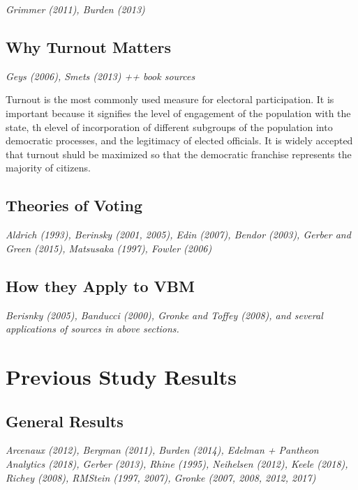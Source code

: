 \documentclass[12pt,twoside]{reedthesis}
\begin{document}
  \emph{Grimmer (2011), Burden (2013)}
  
  \subsection{Why Turnout Matters}\label{why-turnout-matters}
  
  \emph{Geys (2006), Smets (2013) ++ book sources}
  
  Turnout is the most commonly used measure for electoral participation.
  It is important because it signifies the level of engagement of the
  population with the state, th elevel of incorporation of different
  subgroups of the population into democratic processes, and the
  legitimacy of elected officials. It is widely accepted that turnout
  shuld be maximized so that the democratic franchise represents the
  majority of citizens.
  
  \subsection{Theories of Voting}\label{theories-of-voting}
  
  \emph{Aldrich (1993), Berinsky (2001, 2005), Edin (2007), Bendor (2003),
  Gerber and Green (2015), Matsusaka (1997), Fowler (2006)}
  
  \subsection{How they Apply to VBM}\label{how-they-apply-to-vbm}
  
  \emph{Berisnky (2005), Banducci (2000), Gronke and Toffey (2008), and
  several applications of sources in above sections.}
  
  \section{Previous Study Results}\label{previous-study-results}
  
  \subsection{General Results}\label{general-results}
  
  \emph{Arcenaux (2012), Bergman (2011), Burden (2014), Edelman + Pantheon
  Analytics (2018), Gerber (2013), Rhine (1995), Neihelsen (2012), Keele
  (2018), Richey (2008), RMStein (1997, 2007), Gronke (2007, 2008, 2012,
  2017)}
  
\end{document}
